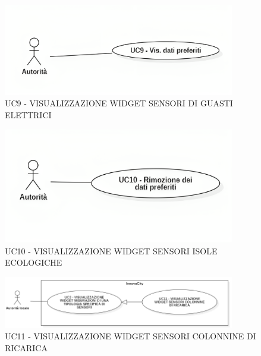
\begin{figure}[H]
    \centering
    \includegraphics[width=0.9\textwidth]{../Images/uc9.png}
    \caption{UC9 - VISUALIZZAZIONE WIDGET SENSORI DI GUASTI ELETTRICI}
\end{figure}


\begin{figure}[H]
    \centering
    \includegraphics[width=0.9\textwidth]{../Images/uc10.png}
    \caption{UC10 - VISUALIZZAZIONE WIDGET SENSORI ISOLE ECOLOGICHE}
\end{figure}


\begin{figure}[H]
    \centering
    \includegraphics[width=0.9\textwidth]{../Images/uc11.PNG}
    \caption{UC11 - VISUALIZZAZIONE WIDGET SENSORI COLONNINE DI RICARICA}
\end{figure}

